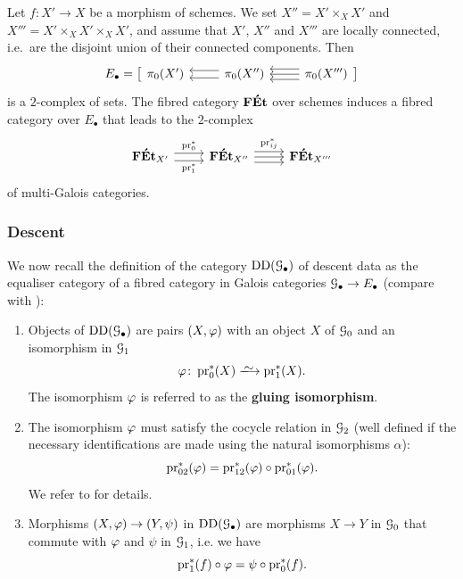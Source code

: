 \begin{ex}
\label{ex:FETdescent}
    Let $f\colon  X' \to X$ be a morphism of schemes. We set $X'' = X' \times_X X'$ and $X'''=X' \times_X X' \times_X X'$, and assume that $X'$, $X''$ and $X'''$ are locally connected, i.e.\ are the disjoint union of their connected components. Then 
    \[
    E_\bullet = \big[
    \begin{tikzcd} 
    \pi_0(X') & \ar[l,shift right=0.7ex] \ar[l,shift left=0.7ex] \pi_0(X'')  & \ar[l,shift right=1ex] \ar[l,shift left=1ex] \ar[l] \pi_0(X''')
    \end{tikzcd}
    \big]
    \]
    is a $2$-complex of sets. The fibred category $\mathbf{F\acute{E}t}$ over schemes induces a fibred category over $E_\bullet$ that leads to the $2$-complex 
    \[
    \begin{tikzcd} 
    \FEt_{X'} \ar[r,shift left=0.7ex,"{\pr_0^\ast}"] \ar[r,shift right=0.7ex,"\pr_1^\ast",swap]   &  \FEt_{X''}  \ar[r, shift left=1ex,"{\pr_{ij}^\ast}"] \ar[r,shift right=1ex] \ar[r] & \FEt_{X'''} 
    \end{tikzcd}
    \]
    of multi-Galois categories. 
\end{ex}


\subsubsection*{Descent} 
We now recall the definition of the category $\operatorname{DD}({\mathcal G}_\bullet)$ of descent data as the equaliser category of a fibred category in Galois categories ${\mathcal G}_\bullet \to E_\bullet$  (compare with \cite[Definition~4.1]{Stix2006:vanKampen}):
\begin{enumerate}
    \item 
    Objects of $\operatorname{DD}({\mathcal G}_\bullet)$ are pairs $(X,\varphi)$ with an object $X$ of ${\mathcal G}_0$ and an isomorphism in ${\mathcal G}_1$
    \[
    \ph \colon \pr_0^\ast(X) \isomto \pr_1^\ast(X).
    \]
    The isomorphism $\varphi$ is referred to as the \textbf{gluing isomorphism}. 
    \item
    The isomorphism $\varphi$ must satisfy the cocycle relation in ${\mathcal G}_2$ (well defined if the necessary identifications are made using the natural isomorphisms $\alpha$):
    \[
    \operatorname{pr}_{02}^\ast(\varphi) = \operatorname{pr}_{12}^\ast(\varphi) \circ \operatorname{pr}_{01}^\ast(\varphi).
    \]
    We refer to \cite[Definition~4.1]{Stix2006:vanKampen} for details.  
    \item 
    Morphisms $(X,\varphi) \to (Y,\psi)$ in $\operatorname{DD}({\mathcal G}_\bullet)$ are morphisms $X \to Y$ in ${\mathcal G}_0$ that commute with $\varphi$ and $\psi$ in ${\mathcal G}_1$, i.e. we have
    \[
    \operatorname{pr}_1^\ast(f) \circ \varphi = \psi \circ \operatorname{pr}_0^\ast(f).
    \]
\end{enumerate}

